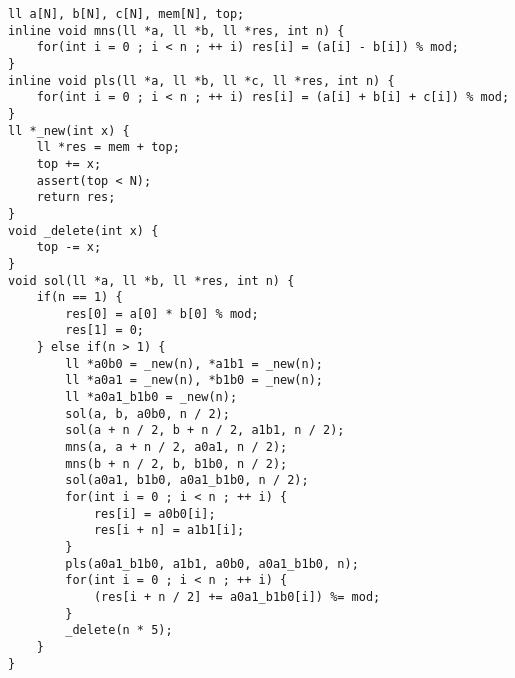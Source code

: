 \documentclass[UTF8]{article}
\begin{document}
\begin{lstlisting}
ll a[N], b[N], c[N], mem[N], top;
inline void mns(ll *a, ll *b, ll *res, int n) {
    for(int i = 0 ; i < n ; ++ i) res[i] = (a[i] - b[i]) % mod;
}
inline void pls(ll *a, ll *b, ll *c, ll *res, int n) {
    for(int i = 0 ; i < n ; ++ i) res[i] = (a[i] + b[i] + c[i]) % mod;
}
ll *_new(int x) {
    ll *res = mem + top;
    top += x;
    assert(top < N);
    return res;
}
void _delete(int x) {
    top -= x;
}
void sol(ll *a, ll *b, ll *res, int n) {
    if(n == 1) {
        res[0] = a[0] * b[0] % mod;
        res[1] = 0;
    } else if(n > 1) {
        ll *a0b0 = _new(n), *a1b1 = _new(n);
        ll *a0a1 = _new(n), *b1b0 = _new(n);
        ll *a0a1_b1b0 = _new(n);
        sol(a, b, a0b0, n / 2);
        sol(a + n / 2, b + n / 2, a1b1, n / 2);
        mns(a, a + n / 2, a0a1, n / 2);
        mns(b + n / 2, b, b1b0, n / 2);
        sol(a0a1, b1b0, a0a1_b1b0, n / 2);
        for(int i = 0 ; i < n ; ++ i) {
            res[i] = a0b0[i];
            res[i + n] = a1b1[i];
        }
        pls(a0a1_b1b0, a1b1, a0b0, a0a1_b1b0, n);
        for(int i = 0 ; i < n ; ++ i) {
            (res[i + n / 2] += a0a1_b1b0[i]) %= mod;
        }
        _delete(n * 5);
    }
}
\end{lstlisting}
\end{document}
